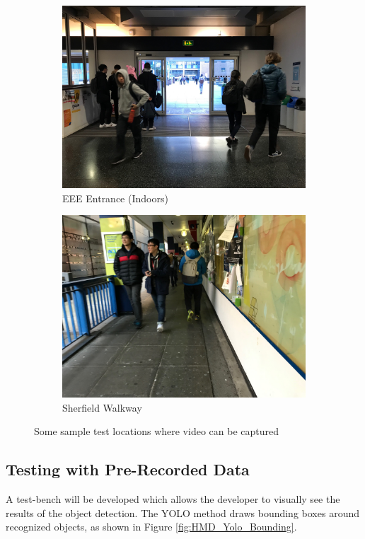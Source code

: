 \documentclass[12pt,a4paper]{report}
\begin{document}
\begin{figure}[ht]
	\begin{subfigure}[b]{.5\textwidth}
		\centering
		\includegraphics[width=.8\linewidth]{Images/Evaluation/HumanDetection/IMG_4080.jpg}
		\caption{EEE Entrance (Indoors)}
	\end{subfigure}%
	\hspace{\fill} 
	\begin{subfigure}[b]{.5\textwidth}
		\centering
		\includegraphics[width=.8\linewidth]{Images/Evaluation/HumanDetection/IMG_4079.jpg}
		\caption{Sherfield Walkway}
	\end{subfigure}	

	\begin{center}
		\caption{Some sample test locations where video can be captured}
		\label{fig:HDS_Test_Locations}
	\end{center}
\end{figure}

\subsection{Testing with Pre-Recorded Data}
A test-bench will be developed which allows the developer to visually see the results of the object detection. The YOLO method draws bounding boxes around recognized objects, as shown in Figure \ref{fig:HMD_Yolo_Bounding}.
\end{document}
